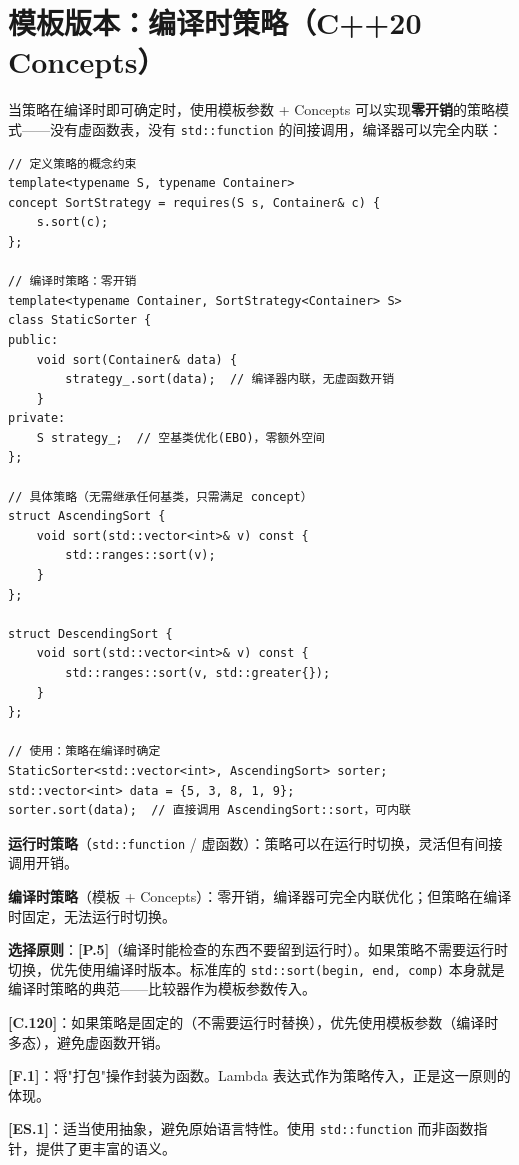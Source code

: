 \documentclass[12pt,a4paper,fontset=fandol]{ctexbook}
\newcommand{\guideref}[1]{\textbf{\textcolor{blue!70!black}{[#1]}}}
\begin{document}
\section{模板版本：编译时策略（C++20 Concepts）}

当策略在编译时即可确定时，使用模板参数 + Concepts 可以实现\textbf{零开销}的策略模式——没有虚函数表，没有 \texttt{std::function} 的间接调用，编译器可以完全内联：

\begin{lstlisting}[style=cppstyle, caption={编译时策略 --- C++20 Concepts}]
// 定义策略的概念约束
template<typename S, typename Container>
concept SortStrategy = requires(S s, Container& c) {
    s.sort(c);
};

// 编译时策略：零开销
template<typename Container, SortStrategy<Container> S>
class StaticSorter {
public:
    void sort(Container& data) {
        strategy_.sort(data);  // 编译器内联，无虚函数开销
    }
private:
    S strategy_;  // 空基类优化(EBO)，零额外空间
};

// 具体策略（无需继承任何基类，只需满足 concept）
struct AscendingSort {
    void sort(std::vector<int>& v) const {
        std::ranges::sort(v);
    }
};

struct DescendingSort {
    void sort(std::vector<int>& v) const {
        std::ranges::sort(v, std::greater{});
    }
};

// 使用：策略在编译时确定
StaticSorter<std::vector<int>, AscendingSort> sorter;
std::vector<int> data = {5, 3, 8, 1, 9};
sorter.sort(data);  // 直接调用 AscendingSort::sort，可内联
\end{lstlisting}

\begin{compare}[title={运行时 vs 编译时策略}]
\textbf{运行时策略}（\texttt{std::function} / 虚函数）：策略可以在运行时切换，灵活但有间接调用开销。

\textbf{编译时策略}（模板 + Concepts）：零开销，编译器可完全内联优化；但策略在编译时固定，无法运行时切换。

\textbf{选择原则}：\guideref{P.5}（编译时能检查的东西不要留到运行时）。如果策略不需要运行时切换，优先使用编译时版本。标准库的 \texttt{std::sort(begin, end, comp)} 本身就是编译时策略的典范——比较器作为模板参数传入。
\end{compare}

\begin{guideline}
\guideref{C.120}：如果策略是固定的（不需要运行时替换），优先使用模板参数（编译时多态），避免虚函数开销。

\guideref{F.1}：将"打包"操作封装为函数。Lambda 表达式作为策略传入，正是这一原则的体现。

\guideref{ES.1}：适当使用抽象，避免原始语言特性。使用 \texttt{std::function} 而非函数指针，提供了更丰富的语义。
\end{guideline}
\end{document}
